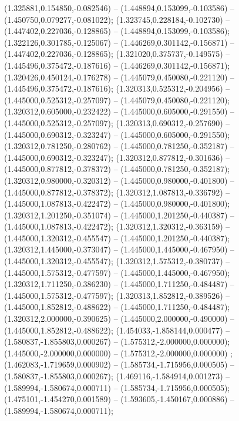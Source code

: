 (1.325881,0.154850,-0.082546) -- (1.448894,0.153099,-0.103586) -- (1.450750,0.079277,-0.081022);
 (1.323745,0.228184,-0.102730) -- (1.447402,0.227036,-0.128865) -- (1.448894,0.153099,-0.103586);
 (1.322126,0.301785,-0.125067) -- (1.446269,0.301142,-0.156871) -- (1.447402,0.227036,-0.128865);
 (1.321020,0.375737,-0.149575) -- (1.445496,0.375472,-0.187616) -- (1.446269,0.301142,-0.156871);
 (1.320426,0.450124,-0.176278) -- (1.445079,0.450080,-0.221120) -- (1.445496,0.375472,-0.187616);
 (1.320313,0.525312,-0.204956) -- (1.445000,0.525312,-0.257097) -- (1.445079,0.450080,-0.221120);
 (1.320312,0.605000,-0.232422) -- (1.445000,0.605000,-0.291550) -- (1.445000,0.525312,-0.257097);
 (1.320313,0.690312,-0.257690) -- (1.445000,0.690312,-0.323247) -- (1.445000,0.605000,-0.291550);
 (1.320312,0.781250,-0.280762) -- (1.445000,0.781250,-0.352187) -- (1.445000,0.690312,-0.323247);
 (1.320312,0.877812,-0.301636) -- (1.445000,0.877812,-0.378372) -- (1.445000,0.781250,-0.352187);
 (1.320312,0.980000,-0.320312) -- (1.445000,0.980000,-0.401800) -- (1.445000,0.877812,-0.378372);
 (1.320312,1.087813,-0.336792) -- (1.445000,1.087813,-0.422472) -- (1.445000,0.980000,-0.401800);
 (1.320312,1.201250,-0.351074) -- (1.445000,1.201250,-0.440387) -- (1.445000,1.087813,-0.422472);
 (1.320312,1.320312,-0.363159) -- (1.445000,1.320312,-0.455547) -- (1.445000,1.201250,-0.440387);
 (1.320312,1.445000,-0.373047) -- (1.445000,1.445000,-0.467950) -- (1.445000,1.320312,-0.455547);
 (1.320312,1.575312,-0.380737) -- (1.445000,1.575312,-0.477597) -- (1.445000,1.445000,-0.467950);
 (1.320312,1.711250,-0.386230) -- (1.445000,1.711250,-0.484487) -- (1.445000,1.575312,-0.477597);
 (1.320313,1.852812,-0.389526) -- (1.445000,1.852812,-0.488622) -- (1.445000,1.711250,-0.484487);
 (1.320312,2.000000,-0.390625) -- (1.445000,2.000000,-0.490000) -- (1.445000,1.852812,-0.488622);
 (1.454033,-1.858144,0.000477) -- (1.580837,-1.855803,0.000267) -- (1.575312,-2.000000,0.000000);
 (1.445000,-2.000000,0.000000) -- (1.575312,-2.000000,0.000000) ;
 (1.462083,-1.719659,0.000902) -- (1.585734,-1.715956,0.000505) -- (1.580837,-1.855803,0.000267);
 (1.469116,-1.584914,0.001273) -- (1.589994,-1.580674,0.000711) -- (1.585734,-1.715956,0.000505);
 (1.475101,-1.454270,0.001589) -- (1.593605,-1.450167,0.000886) -- (1.589994,-1.580674,0.000711);
